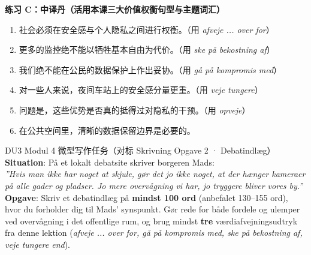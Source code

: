 \textbf{练习 C：中译丹（活用本课三大价值权衡句型与主题词汇）}
\begin{enumerate}
  \item 社会必须在安全感与个人隐私之间进行权衡。（用 \textit{afveje ... over for}）
  \item 更多的监控绝不能以牺牲基本自由为代价。（用 \textit{ske på bekostning af}）
  \item 我们绝不能在公民的数据保护上作出妥协。（用 \textit{gå på kompromis med}）
  \item 对一些人来说，夜间车站上的安全感分量更重。（用 \textit{veje tungere}）
  \item 问题是，这些优势是否真的抵得过对隐私的干预。（用 \textit{opveje}）
  \item 在公共空间里，清晰的数据保留边界是必要的。
\end{enumerate}


\begin{emailbox}{DU3 Modul 4 微型写作任务（对标 Skrivning Opgave 2 · Debatindlæg）}
\textbf{Situation}: På et lokalt debatsite skriver borgeren Mads:\\
\textit{”Hvis man ikke har noget at skjule, gør det jo ikke noget, at der hænger kameraer på alle gader og pladser. Jo mere overvågning vi har, jo tryggere bliver vores by.”}\\[4pt]
\textbf{Opgave}: Skriv et debatindlæg på \textbf{mindst 100 ord} (anbefalet 130--155 ord), hvor du forholder dig til Mads' synspunkt. Gør rede for både fordele og ulemper ved overvågning i det offentlige rum, og brug mindst \textbf{tre} værdiafvejningsudtryk fra denne lektion (\textit{afveje ... over for, gå på kompromis med, ske på bekostning af, veje tungere end}).
\end{emailbox}

